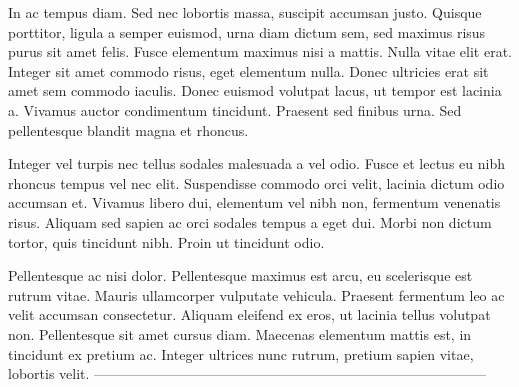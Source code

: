 \documentclass[10pt, a4paper, twocolumn]{article} %
\begin{document}
In ac tempus diam. Sed nec lobortis massa, suscipit accumsan justo. Quisque porttitor, ligula a semper euismod, urna diam dictum sem, sed maximus risus purus sit amet felis. Fusce elementum maximus nisi a mattis. Nulla vitae elit erat. Integer sit amet commodo risus, eget elementum nulla. Donec ultricies erat sit amet sem commodo iaculis. Donec euismod volutpat lacus, ut tempor est lacinia a. Vivamus auctor condimentum tincidunt. Praesent sed finibus urna. Sed pellentesque blandit magna et rhoncus.

Integer vel turpis nec tellus sodales malesuada a vel odio. Fusce et lectus eu nibh rhoncus tempus vel nec elit. Suspendisse commodo orci velit, lacinia dictum odio accumsan et. Vivamus libero dui, elementum vel nibh non, fermentum venenatis risus. Aliquam sed sapien ac orci sodales tempus a eget dui. Morbi non dictum tortor, quis tincidunt nibh. Proin ut tincidunt odio.

Pellentesque ac nisi dolor. Pellentesque maximus est arcu, eu scelerisque est rutrum vitae. Mauris ullamcorper vulputate vehicula. Praesent fermentum leo ac velit accumsan consectetur. Aliquam eleifend ex eros, ut lacinia tellus volutpat non. Pellentesque sit amet cursus diam. Maecenas elementum mattis est, in tincidunt ex pretium ac. Integer ultrices nunc rutrum, pretium sapien vitae, lobortis velit.
------------------------------------------------------------------------------------
\end{document}
